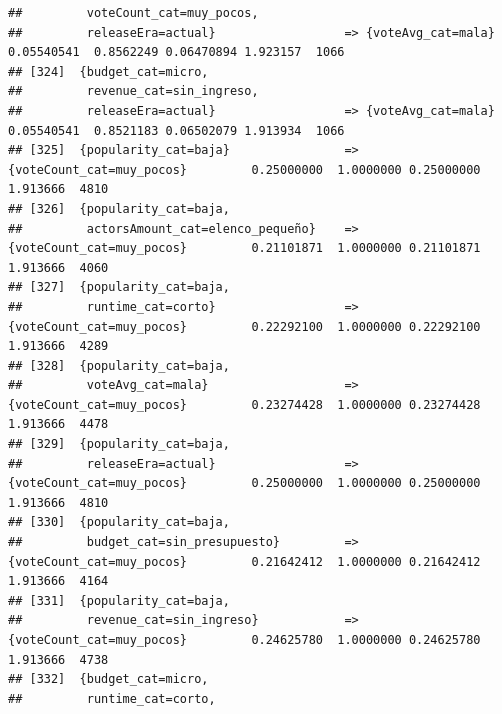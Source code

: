 \documentclass[
]{article}
\begin{document}
\begin{verbatim}
##         voteCount_cat=muy_pocos,                                                                                                
##         releaseEra=actual}                  => {voteAvg_cat=mala}                0.05540541  0.8562249 0.06470894 1.923157  1066
## [324]  {budget_cat=micro,                                                                                                       
##         revenue_cat=sin_ingreso,                                                                                                
##         releaseEra=actual}                  => {voteAvg_cat=mala}                0.05540541  0.8521183 0.06502079 1.913934  1066
## [325]  {popularity_cat=baja}                => {voteCount_cat=muy_pocos}         0.25000000  1.0000000 0.25000000 1.913666  4810
## [326]  {popularity_cat=baja,                                                                                                    
##         actorsAmount_cat=elenco_pequeño}    => {voteCount_cat=muy_pocos}         0.21101871  1.0000000 0.21101871 1.913666  4060
## [327]  {popularity_cat=baja,                                                                                                    
##         runtime_cat=corto}                  => {voteCount_cat=muy_pocos}         0.22292100  1.0000000 0.22292100 1.913666  4289
## [328]  {popularity_cat=baja,                                                                                                    
##         voteAvg_cat=mala}                   => {voteCount_cat=muy_pocos}         0.23274428  1.0000000 0.23274428 1.913666  4478
## [329]  {popularity_cat=baja,                                                                                                    
##         releaseEra=actual}                  => {voteCount_cat=muy_pocos}         0.25000000  1.0000000 0.25000000 1.913666  4810
## [330]  {popularity_cat=baja,                                                                                                    
##         budget_cat=sin_presupuesto}         => {voteCount_cat=muy_pocos}         0.21642412  1.0000000 0.21642412 1.913666  4164
## [331]  {popularity_cat=baja,                                                                                                    
##         revenue_cat=sin_ingreso}            => {voteCount_cat=muy_pocos}         0.24625780  1.0000000 0.24625780 1.913666  4738
## [332]  {budget_cat=micro,                                                                                                       
##         runtime_cat=corto,                                                                                                      

\end{verbatim}
\end{document}
